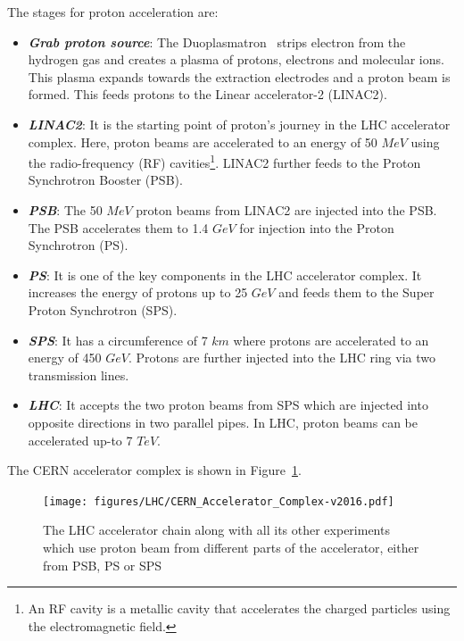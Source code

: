 The stages for proton acceleration are:
\begin{itemize}
    \item {\textit {\textbf {Grab proton source}}}: The Duoplasmatron~\cite{LHC-tdr-vol3} strips electron from the hydrogen gas and creates a plasma of protons, electrons and molecular ions. This plasma expands towards the extraction electrodes and a proton beam is formed. This feeds protons to the Linear accelerator-2 (LINAC2).
    \item {\textit {\textbf {LINAC2}}}: It is the starting point of proton's journey in the LHC accelerator complex. Here, proton beams are accelerated to an energy of 50 $MeV$ using the radio-frequency (RF) cavities\footnote{An RF cavity is a metallic cavity that accelerates the charged particles using the electromagnetic field.}. LINAC2 further feeds to the Proton Synchrotron Booster (PSB).
    \item {\textit {\textbf {PSB}}}: The 50 $MeV$ proton beams from LINAC2 are injected into the PSB. The PSB accelerates them to 1.4 $GeV$ for injection into the Proton Synchrotron (PS).
    \item {\textit {\textbf {PS}}}: It is one of the key components in the LHC accelerator complex. It increases the energy of protons up to 25 $GeV$ and feeds them to the Super Proton Synchrotron (SPS).
    \item {\textit {\textbf {SPS}}}: It has a circumference of 7 $km$ where protons are accelerated to an energy of 450 $GeV$. Protons are further injected into the LHC ring via two transmission lines.
    \item {\textit {\textbf {LHC}}}: It accepts the two proton beams from SPS which are injected into opposite directions in two parallel pipes. In LHC, proton beams can be accelerated up-to 7 $TeV$.
\end{itemize}
The CERN accelerator complex is shown in Figure~\ref{fig:CERN-accelerator-complex}.  
\begin{figure}[!htbp]
	\centering
	\texttt{[image: figures/LHC/CERN\_Accelerator\_Complex-v2016.pdf]}
	\caption{The LHC accelerator chain along with all its other experiments which use proton beam from different parts of the accelerator, either from PSB, PS or SPS~\cite{Fig-CERN-accelerator-complex}}
	\label{fig:CERN-accelerator-complex}
\end{figure}
